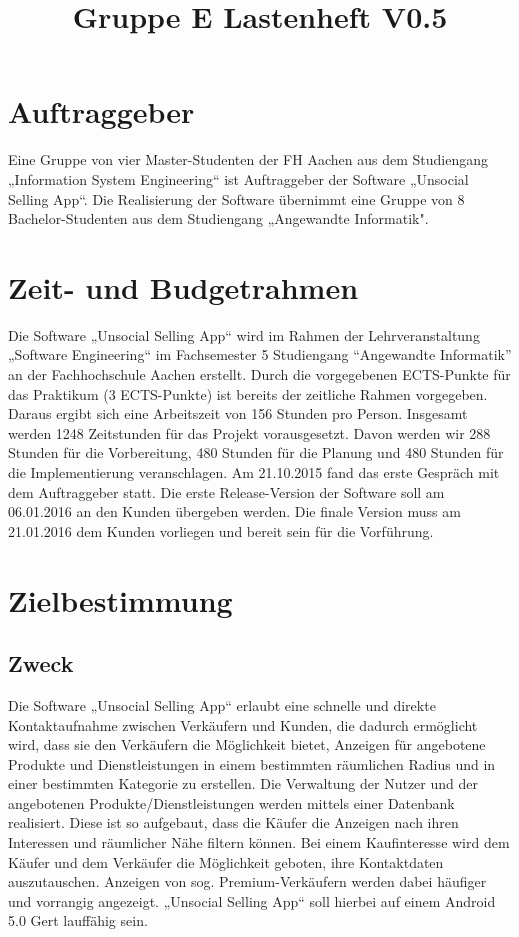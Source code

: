 \documentclass[a4paper,12pt,oneside]{scrartcl}
\title{Gruppe E Lastenheft V0.5}
\begin{document}
\maketitle
\newpage
\tableofcontents
\newpage

\section{Auftraggeber}
Eine Gruppe von vier Master-Studenten der FH Aachen aus dem Studiengang „Information System Engineering“ ist Auftraggeber der Software „Unsocial Selling App“. 
Die Realisierung der Software übernimmt eine Gruppe von 8 Bachelor-Studenten aus dem Studiengang „Angewandte Informatik".




\section{Zeit- und Budgetrahmen}
Die Software „Unsocial Selling App“ wird im Rahmen der Lehrveranstaltung „Software Engineering“ im Fachsemester 5 Studiengang “Angewandte Informatik” an der Fachhochschule Aachen erstellt.
Durch die vorgegebenen ECTS-Punkte für das Praktikum (3 ECTS-Punkte) ist bereits der zeitliche Rahmen vorgegeben.
Daraus ergibt sich eine Arbeitszeit von 156 Stunden pro Person. Insgesamt werden 1248 Zeitstunden für das Projekt vorausgesetzt. 
Davon werden wir 288 Stunden für die Vorbereitung, 480 Stunden für die Planung und 480 Stunden für die Implementierung veranschlagen. 
Am 21.10.2015 fand das erste Gespräch mit dem Auftraggeber statt.
Die erste Release-Version der Software soll am 06.01.2016 an den Kunden übergeben werden.
Die finale Version muss am 21.01.2016 dem Kunden vorliegen und bereit sein für die Vorführung. 




\section{Zielbestimmung}
\subsection{Zweck}
Die Software „Unsocial Selling App“ erlaubt eine schnelle und direkte Kontaktaufnahme zwischen Verkäufern und Kunden, die dadurch ermöglicht wird, dass sie den Verkäufern die Möglichkeit bietet, Anzeigen für angebotene Produkte und Dienstleistungen in einem bestimmten räumlichen Radius und in einer bestimmten Kategorie zu erstellen.
Die Verwaltung der Nutzer und der angebotenen Produkte/Dienstleistungen werden mittels einer Datenbank realisiert.
Diese ist so aufgebaut, dass die Käufer die Anzeigen nach ihren Interessen und räumlicher Nähe filtern können.
Bei einem Kaufinteresse wird dem Käufer und dem Verkäufer die Möglichkeit geboten, ihre Kontaktdaten auszutauschen.
Anzeigen von sog. Premium-Verkäufern werden dabei häufiger und vorrangig angezeigt.
„Unsocial Selling App“ soll hierbei auf einem Android 5.0 Gert lauffähig sein.
\end{document}
